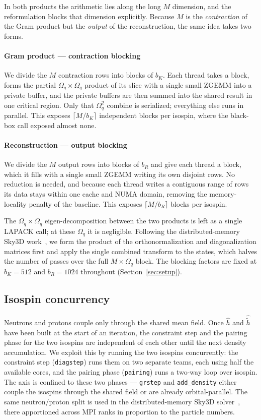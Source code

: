 \documentclass[preprint,12pt]{elsarticle}
\numberwithin{equation}{section}
\begin{document}
In both products the arithmetic lies along the long $M$ dimension, and the reformulation blocks that dimension explicitly. Because $M$ is the \emph{contraction} of the Gram product but the \emph{output} of the reconstruction, the same idea takes two forms.

\paragraph{Gram product --- contraction blocking}
We divide the $M$ contraction rows into blocks of $b_K$. Each thread takes a block, forms the partial $\Omega_q\times\Omega_q$ product of its slice with a single small ZGEMM into a private buffer, and the private buffers are then summed into the shared result in one critical region. Only that $\Omega_q^2$ combine is serialized; everything else runs in parallel. This exposes $\lceil M/b_K\rceil$ independent blocks per isospin, where the black-box call exposed almost none.

\paragraph{Reconstruction --- output blocking}
We divide the $M$ output rows into blocks of $b_R$ and give each thread a block, which it fills with a single small ZGEMM writing its own disjoint rows. No reduction is needed, and because each thread writes a contiguous range of rows its data stays within one cache and NUMA domain, removing the memory-locality penalty of the baseline. This exposes $\lceil M/b_R\rceil$ blocks per isospin.

The $\Omega_q\times\Omega_q$ eigen-decomposition between the two products is left as a single LAPACK call; at these $\Omega_q$ it is negligible. Following the distributed-memory Sky3D work~\cite{sky3dmpi}, we form the product of the orthonormalization and diagonalization matrices first and apply the single combined transform to the states, which halves the number of passes over the full $M\times\Omega_q$ block. The blocking factors are fixed at $b_K=512$ and $b_R=1024$ throughout (Section~\ref{sec:setup}).

\subsection{Isospin concurrency}\label{sec:iso}
Neutrons and protons couple only through the shared mean field. Once $\hat h$ and $\hat{\tilde h}$ have been built at the start of an iteration, the constraint step and the pairing phase for the two isospins are independent of each other until the next density accumulation. We exploit this by running the two isospins concurrently: the constraint step (\texttt{diagstep}) runs them on two separate teams, each using half the available cores, and the pairing phase (\texttt{pairing}) runs a two-way loop over isospin. The axis is confined to these two phases --- \texttt{grstep} and \texttt{add\_density} either couple the isospins through the shared field or are already orbital-parallel. The same neutron/proton split is used in the distributed-memory Sky3D solver~\cite{sky3dmpi}, there apportioned across MPI ranks in proportion to the particle numbers.
\end{document}
